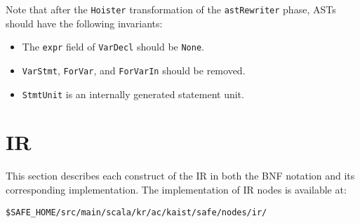 Note that after the \verb!Hoister! transformation of the \verb!astRewriter! phase,
ASTs should have the following invariants:
\begin{itemize}
\item The {\tt expr} field of {\tt VarDecl} should be {\tt None}.
\item {\tt VarStmt}, {\tt ForVar}, and {\tt ForVarIn} should be removed.
\item {\tt StmtUnit} is an internally generated statement unit.
\end{itemize}

\section{IR}
This section describes each construct of the \safe IR
in both the BNF notation and its corresponding implementation.
The implementation of IR nodes is available at:
\begin{verbatim}
$SAFE_HOME/src/main/scala/kr/ac/kaist/safe/nodes/ir/
\end{verbatim}
\small
